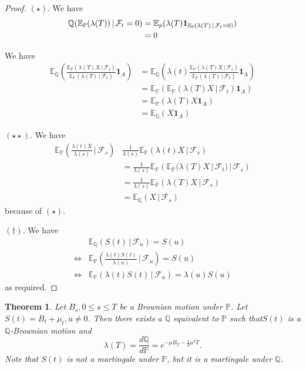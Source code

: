 \documentclass[10pt, oneside, reqno]{amsart}
\theoremstyle{plain}%
\newtheorem{thm}{Theorem}[section]
\theoremstyle{definition}
\theoremstyle{remark}
\newcommand{\given}{ \, | \,}
\newcommand{\Q}{\mathbb{Q}}
\renewcommand{\P}{\mathbb{P}}
\newcommand{\E}{\mathbb{E}}
\newcommand{\sigf}{\mathcal{F}}
\begin{document}
\begin{proof}
    $(\star)$.  We have
    \begin{align*}
        \Q(\E_\P(\lambda(T)) \given \sigf_t = 0) &= \E_p(\lambda(T) \indic{\E_\P(\lambda(T) \given \sigf_t = 0)}) \\
        &= 0
    \end{align*} 
    
    
    We have \begin{align*}
        \E_\Q \left( \frac{\E_\P(\lambda(T) X \given \sigf_t )}{\E_\P(\lambda(T) \given \sigf_t)} \mathbf{1}_A \right)  &= \E_\Q \left( \lambda(t) \frac{\E_\P(\lambda(T) X \given \sigf_t )}{\E_\P(\lambda(T) \given \sigf_t)} \mathbf{1}_A \right) \\
        &= \E_\P \left( \E_\P( \lambda(T) X \given \sigf_t) \mathbf{1}_A \right) \\
        &= \E_\P (\lambda(T) X \mathbf{1}_A) \\
        &= \E_\Q( X \mathbf{1}_A)
    \end{align*}

    $(\star \star)$.  We have \begin{align*}
        \E_\P \left( \frac{\lambda(t) X}{\lambda(s)} \given \sigf_s \right) & \frac{1}{\lambda(s)} \E_\P(\lambda(t) X \given \sigf_s) \\
        &= \frac{1}{\lambda(s)} \E_\P\left( \E_\P(\lambda(T) X \given \sigf_t) \given \sigf_s \right) \\
        &= \frac{1}{\lambda(s)} \E_\P(\lambda(T) X \given \sigf_s) \\
        &= \E_\Q(X \given \sigf_s)
    \end{align*} because of $(\star)$.
    
    $(\dagger)$.     We have \begin{align*}
            &\E_\Q(S(t) \given \sigf_u) = S(u)  \\
        \iff &\E_\P \left( \frac{\lambda(t) S(t)}{\lambda(u)} \given \sigf_u \right) = S(u) \\
        \iff &\E_\P(\lambda(t) S(t) \given \sigf_u) = \lambda(u) S(u) 
    \end{align*} as required.
\end{proof}


\begin{thm}
    Let $B_s, 0 \leq s \leq T$ be a Brownian motion under $\P$.  Let $S(t) = B_t + \mu_t, u \neq 0$.  Then there exists a $\Q$ equivalent to $\P$ such that$S(t)$ is a $\Q$-Brownian motion and \[
        \lambda(T) = \frac{d\Q}{d\P} = e^{- \mu B_T - \frac{1}{2} \mu^2 T}.
    \]   Note that $S(t)$ is not a martingale under $\P$, but it is a martingale under $\Q$.
\end{thm}   
\end{document}
